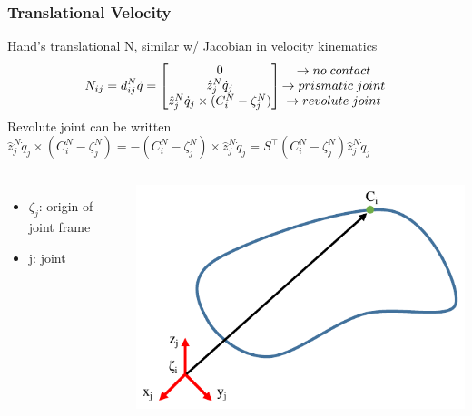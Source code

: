 \documentclass{beamer}
\begin{document}
\begin{frame}
\frametitle{Translational Velocity }
Hand's translational N, similar w/ Jacobian in velocity kinematics 
\begin{equation*}
N_{ij}=d_{ij}^N\dot{q}=\begin{bmatrix}
0\\
\hat{z}_{j}^{N}\dot{q}_j\\
\hat{z}_{j}^{N}\dot{q}_j\times (C_{i}^{N}-\zeta_{j}^{N})
\end{bmatrix}
\begin{matrix}
\rightarrow no \hspace{.1cm} contact\\
\rightarrow prismatic \hspace{.1cm} joint\\
\rightarrow revolute \hspace{.1cm} joint
\end{matrix}
\end{equation*}
Revolute joint can be written 
$\hat{z}_{j}^{N}\dot{q}_j\times (C_{i}^{N}-\zeta_{j}^{N})=-(C_{i}^{N}-\zeta_{j}^{N})\times \hat{z}_{j}^{N}\dot{q}_j=S^{\intercal}(C_{i}^{N}-\zeta_{j}^{N})\hat{z}_{j}^{N}\dot{q}_j$

\begin{columns}[c] 
\begin{itemize}
\item $\zeta_j$: origin of joint frame
\item j: joint 
\end{itemize}

\centering
 \includegraphics[width=.8\textwidth]{figures/HandTranslationCrop.pdf}
\end{columns}

\end{frame}
\end{document}
